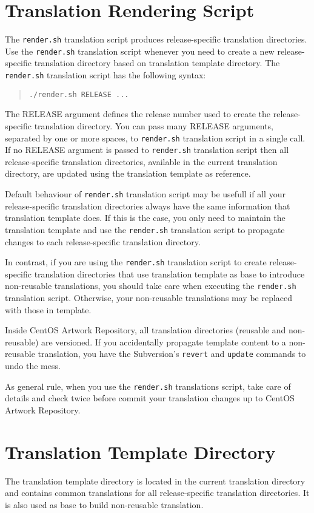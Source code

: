 \section{Translation Rendering Script}
\hypertarget{sec:Concepts:Translations:RenderingScripts}{}

The \texttt{render.sh} translation script produces release-specific
translation directories.  Use the \texttt{render.sh} translation script
whenever you need to create a new release-specific translation
directory based on translation template directory.  The \texttt{render.sh}
translation script has the following syntax:

\begin{quote}
\texttt{./render.sh RELEASE ...}
\end{quote}

The RELEASE argument defines the release number used to create the
release-specific translation directory. You can pass many RELEASE
arguments, separated by one or more spaces, to \texttt{render.sh}
translation script in a single call.  If no RELEASE argument is passed
to \texttt{render.sh} translation script then all release-specific
translation directories, available in the current translation
directory, are updated using the translation template as reference.

Default behaviour of \texttt{render.sh} translation script may be
usefull if all your release-specific translation directories always
have the same information that translation template does.  If this is
the case, you only need to maintain the translation template and use
the \texttt{render.sh} translation script to propagate changes to each
release-specific translation directory.

In contrast, if you are using the \texttt{render.sh} translation
script to create release-specific translation directories that use
translation template as base to introduce non-reusable translations,
you should take care when executing the \texttt{render.sh} translation
script.  Otherwise, your non-reusable translations may be replaced
with those in template.

Inside CentOS Artwork Repository, all translation directories
(reusable and non-reusable) are versioned. If you accidentally
propagate template content to a non-reusable translation, you have the
Subversion's \texttt{revert} and \texttt{update} commands to undo the
mess.

As general rule, when you use the \texttt{render.sh} translations
script, take care of details and check twice before commit your
translation changes up to CentOS Artwork Repository.

\section{Translation Template Directory}
\hypertarget{sec:Concepts:Translations:TemplateDirectory}{}

The translation template directory is located in the current
translation directory and contains common translations for all
release-specific translation directories. It is also used as base to
build non-reusable translation.
